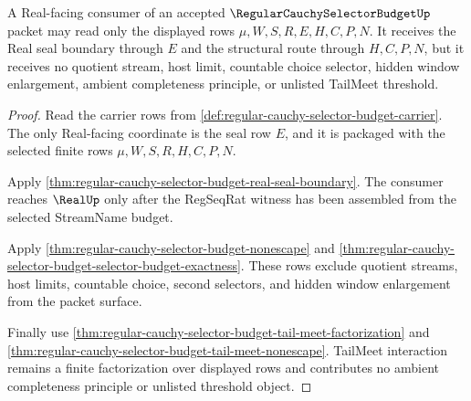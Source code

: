 \begin{theorem}
\label{thm:regular-cauchy-selector-budget-real-seal-nonescape-package}
A Real-facing consumer of an accepted $\RegularCauchySelectorBudgetUp$ packet may read only the displayed rows $\mu,W,S,R,E,H,C,P,N$. It receives the Real seal boundary through $E$ and the structural route through $H,C,P,N$, but it receives no quotient stream, host limit, countable choice selector, hidden window enlargement, ambient completeness principle, or unlisted TailMeet threshold.
\end{theorem}
\begin{proof}
Read the carrier rows from \autoref{def:regular-cauchy-selector-budget-carrier}. The only Real-facing coordinate is the seal row $E$, and it is packaged with the selected finite rows $\mu,W,S,R,H,C,P,N$.

Apply \autoref{thm:regular-cauchy-selector-budget-real-seal-boundary}. The consumer reaches $\RealUp$ only after the RegSeqRat witness has been assembled from the selected StreamName budget.

Apply \autoref{thm:regular-cauchy-selector-budget-nonescape} and \autoref{thm:regular-cauchy-selector-budget-selector-budget-exactness}. These rows exclude quotient streams, host limits, countable choice, second selectors, and hidden window enlargement from the packet surface.

Finally use \autoref{thm:regular-cauchy-selector-budget-tail-meet-factorization} and \autoref{thm:regular-cauchy-selector-budget-tail-meet-nonescape}. TailMeet interaction remains a finite factorization over displayed rows and contributes no ambient completeness principle or unlisted threshold object.
\end{proof}

